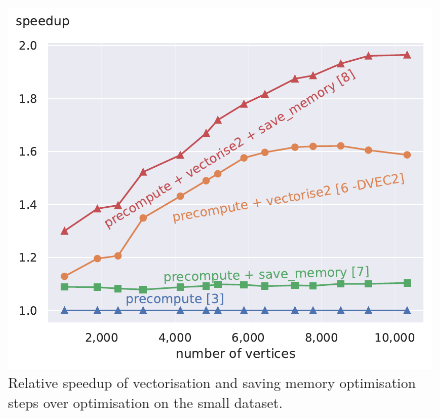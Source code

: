 \documentclass[letterpaper]{article}
\begin{document}
\begin{figure}\centering
	\includegraphics[width=\linewidth]{img/speedup[3][6][7][8]_small.pdf}
	\caption{Relative speedup of vectorisation and saving memory optimisation steps over optimisation  on the small dataset. \label{cpctVectSpeedupSmall}}
\end{figure}
\end{document}
